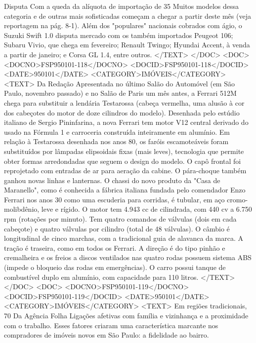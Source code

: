 Disputa 
Com a queda da alíquota de importação de 35%
Muitos modelos dessa categoria e de outras mais sofisticadas começam a chegar a partir deste mês (veja reportagem na pág. 8-1).
Além dos "populares" nacionais cobrados com ágio, o Suzuki Swift 1.0 disputa mercado com os também importados Peugeot 106; Subaru Vivio, que chega em fevereiro; Renault Twingo; Hyundai Accent, à venda a partir de janeiro; e Corsa GL 1.4, entre outros.
</TEXT>
</DOC>
<DOC>
<DOCNO>FSP950101-118</DOCNO>
<DOCID>FSP950101-118</DOCID>
<DATE>950101</DATE>
<CATEGORY>IMÓVEIS</CATEGORY>
<TEXT>
Da Redação 
Apresentada no último Salão do Automóvel (em São Paulo, novembro passado) e no Salão de Paris um mês antes, a Ferrari 512M chega para substituir a lendária Testarossa (cabeça vermelha, uma alusão à cor dos cabeçotes do motor de doze cilindros do modelo).
Desenhada pelo estúdio italiano de Sergio Pininfarina, a nova Ferrari tem motor V12 central derivado do usado na Fórmula 1 e carroceria construída inteiramente em alumínio.
Em relação à Testarossa desenhada nos anos 80, os faróis escamoteáveis foram substituídos por lâmpadas elipsoidais fixas (mais leves), tecnologia que permite obter formas arredondadas que seguem o design do modelo.
O capô frontal foi reprojetado com entradas de ar para aeração da cabine. O pára-choque também ganhou novas linhas e lanternas.
O chassi do novo produto da "Casa de Maranello", como é conhecida a fábrica italiana fundada pelo comendador Enzo Ferrari nos anos 30 como uma escuderia para corridas, é tubular, em aço cromo-molibdênio, leve e rígido.
O motor tem 4.943 cc de cilindrada, com 440 cv a 6.750 rpm (rotações por minuto). Tem quatro comandos de válvulas (dois em cada cabeçote) e quatro válvulas por cilindro (total de 48 válvulas).
O câmbio é longitudinal de cinco marchas, com a tradicional guia de alavanca da marca. A tração é traseira, como em todos os Ferrari.
A direção é do tipo pinhão e cremalheira e os freios a discos ventilados nas quatro rodas possuem sistema ABS (impede o bloqueio das rodas em emergências).
O carro possui tanque de combustível duplo em alumínio, com capacidade para 110 litros.
</TEXT>
</DOC>
<DOC>
<DOCNO>FSP950101-119</DOCNO>
<DOCID>FSP950101-119</DOCID>
<DATE>950101</DATE>
<CATEGORY>IMÓVEIS</CATEGORY>
<TEXT>
Em regiões tradicionais, 70%
Da Agência Folha 
Ligações afetivas com família e vizinhança e a proximidade com o trabalho. Esses fatores criaram uma característica marcante nos compradores de imóveis novos em São Paulo: a fidelidade ao bairro.
